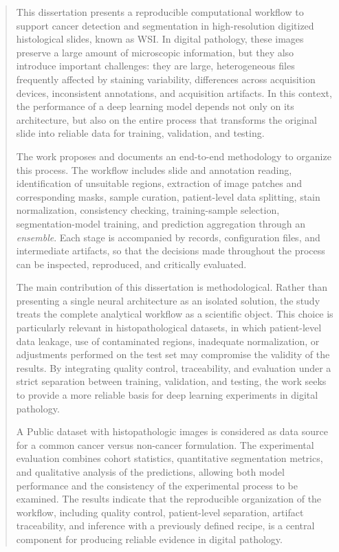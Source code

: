 \begin{abstract}
This dissertation presents a reproducible computational workflow to support cancer detection and segmentation in high-resolution digitized histological slides, known as WSI. In digital pathology, these images preserve a large amount of microscopic information, but they also introduce important challenges: they are large, heterogeneous files frequently affected by staining variability, differences across acquisition devices, inconsistent annotations, and acquisition artifacts. In this context, the performance of a deep learning model depends not only on its architecture, but also on the entire process that transforms the original slide into reliable data for training, validation, and testing.

The work proposes and documents an end-to-end methodology to organize this process. The workflow includes slide and annotation reading, identification of unsuitable regions, extraction of image patches and corresponding masks, sample curation, patient-level data splitting, stain normalization, consistency checking, training-sample selection, segmentation-model training, and prediction aggregation through an \textit{ensemble}. Each stage is accompanied by records, configuration files, and intermediate artifacts, so that the decisions made throughout the process can be inspected, reproduced, and critically evaluated.

The main contribution of this dissertation is methodological. Rather than presenting a single neural architecture as an isolated solution, the study treats the complete analytical workflow as a scientific object. This choice is particularly relevant in histopathological datasets, in which patient-level data leakage, use of contaminated regions, inadequate normalization, or adjustments performed on the test set may compromise the validity of the results. By integrating quality control, traceability, and evaluation under a strict separation between training, validation, and testing, the work seeks to provide a more reliable basis for deep learning experiments in digital pathology.

A Public dataset with histopathologic images is considered as data source for a common cancer versus non-cancer formulation. The experimental evaluation combines cohort statistics, quantitative segmentation metrics, and qualitative analysis of the predictions, allowing both model performance and the consistency of the experimental process to be examined. The results indicate that the reproducible organization of the workflow, including quality control, patient-level separation, artifact traceability, and inference with a previously defined recipe, is a central component for producing reliable evidence in digital pathology.
\end{abstract}

